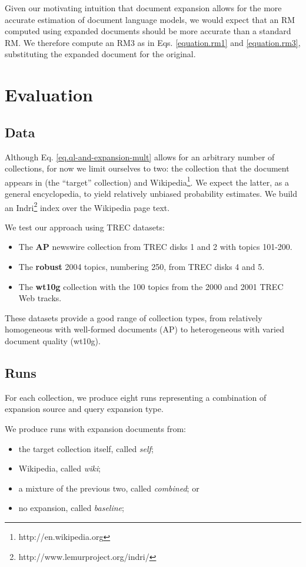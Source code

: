 \documentclass{sig-alternate}
\begin{document}
Given our motivating intuition that document expansion allows for the more accurate estimation of document language models, we would expect that an RM computed using expanded documents should be more accurate than a standard RM. We therefore compute an RM3 as in Eqs. \ref{equation.rm1} and \ref{equation.rm3}, substituting the expanded document for the original.

\section{Evaluation}\label{section.evaluation}

\subsection{Data}\label{section.evaluation.collections}

Although Eq. \ref{eq.ql-and-expansion-mult} allows for an arbitrary number of collections, for now we limit ourselves to two: the collection that the document appears in (the ``target'' collection) and Wikipedia\footnote{http://en.wikipedia.org}. We expect the latter, as a general encyclopedia, to yield relatively unbiased probability estimates. We build an Indri\footnote{http://www.lemurproject.org/indri/} index over the Wikipedia page text.

We test our approach using TREC datasets:
\begin{itemize}
	\item The \textbf{AP} newswire collection from TREC disks 1 and 2 with topics 101-200.
	\item The \textbf{robust} 2004 topics, numbering 250, from TREC disks 4 and 5.
	\item The \textbf{wt10g} collection with the 100 topics from the 2000 and 2001 TREC Web tracks.
\end{itemize}

These datasets provide a good range of collection types, from relatively homogeneous with well-formed documents (AP) to heterogeneous with varied document quality (wt10g).

\subsection{Runs}\label{section.evaluation.runs}

For each collection, we produce eight runs representing a combination of expansion source and query expansion type.

We produce runs with expansion documents from:
\begin{itemize}
	\item the target collection itself, called \textit{self};
	\item Wikipedia, called \textit{wiki};
	\item a mixture of the previous two, called \textit{combined}; or
	\item no expansion, called \textit{baseline};
\end{itemize}
\end{document}
